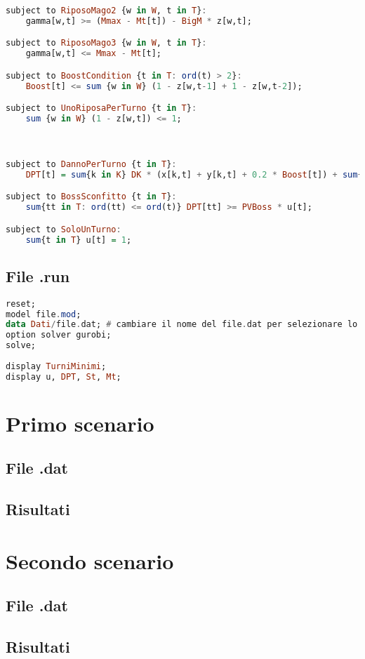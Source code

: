 \documentclass[12pt]{article}
\begin{document}
\begin{lstlisting}[language=haskell, frame=single, caption={Modello in Ampl}, captionpos=b, keywordstyle=\color{purple}]
subject to RiposoMago2 {w in W, t in T}:
    gamma[w,t] >= (Mmax - Mt[t]) - BigM * z[w,t];

subject to RiposoMago3 {w in W, t in T}:
    gamma[w,t] <= Mmax - Mt[t];

subject to BoostCondition {t in T: ord(t) > 2}:
    Boost[t] <= sum {w in W} (1 - z[w,t-1] + 1 - z[w,t-2]);

subject to UnoRiposaPerTurno {t in T}:
    sum {w in W} (1 - z[w,t]) <= 1;



subject to DannoPerTurno {t in T}:
    DPT[t] = sum{k in K} DK * (x[k,t] + y[k,t] + 0.2 * Boost[t]) + sum{w in W} z[w,t] * DW;

subject to BossSconfitto {t in T}:
    sum{tt in T: ord(tt) <= ord(t)} DPT[tt] >= PVBoss * u[t];

subject to SoloUnTurno:
    sum{t in T} u[t] = 1;
\end{lstlisting}

\subsection{File .run}
\begin{lstlisting}[language=haskell, frame=single, caption={File di esecuzione}, captionpos=b, keywordstyle=\color{purple}]  
reset;
model file.mod;
data Dati/file.dat; # cambiare il nome del file.dat per selezionare lo scenario
option solver gurobi;
solve;
    
display TurniMinimi; 
display u, DPT, St, Mt;
\end{lstlisting}


    \section{Primo scenario}
    \subsection{File .dat}
    \subsection{Risultati}
    \section{Secondo scenario}
    \subsection{File .dat}
    \subsection{Risultati}
\end{document}
